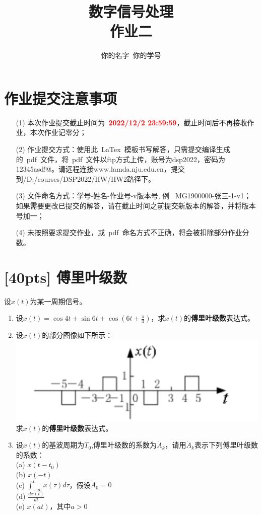 \documentclass[a4paper,UTF8]{article}
\numberwithin{equation}{section}
\begin{document}
\title{数字信号处理\\
作业二}
\author{你的名字\, 你的学号} 
\maketitle

\section*{作业提交注意事项}
\begin{tcolorbox}
\begin{enumerate}
  \item[(1)] 本次作业提交截止时间为~\textcolor{red}{\textbf{2022/12/2  23:59:59}}，截止时间后不再接收作业，本次作业记零分；
  \item[(2)] 作业提交方式：使用此~LaTex~模板书写解答，只需提交编译生成的~pdf~文件，将~pdf~文件以ftp方式上传，账号为dsp2022，密码为12345asd!@。请远程连接www.lamda.nju.edu.cn，提交到/D:/courses/DSP2022/HW/HW2路径下。
  \item[(3)] 文件命名方式：学号-姓名-作业号-v版本号, 例~ MG1900000-张三-1-v1；如果需要更改已提交的解答，请在截止时间之前提交新版本的解答，并将版本号加一；
  \item[(4)] 未按照要求提交作业，或~pdf~命名方式不正确，将会被扣除部分作业分数。

\end{enumerate}
\end{tcolorbox}


\newpage
\section{[40pts] 傅里叶级数}
设$x(t)$为某一周期信号。
\begin{enumerate}[(1)]
	\item 设$x(t)=\cos4t+\sin6t+\cos(6t+\displaystyle\frac{\pi}{3}) $，求$x(t)$的\textbf{傅里叶级数}表达式。
	\item 设$x(t)$的部分图像如下所示：\\
	\includegraphics[scale=0.4]{1.png}\\
	求$x(t)$的\textbf{傅里叶级数}表达式。
	\item 设$x(t)$的基波周期为$T_0$,傅里叶级数的系数为$\dot{A}_k$，请用$\dot{A}_k$表示下列傅里叶级数的系数：\\
	(a) $x(t-t_0)$\\
	(b) $x(-t)$\\
	(c) $\displaystyle\int_{-\infty}^tx(\tau)d\tau$，假设$\dot{A}_0=0$\\
	(d) $\displaystyle\frac{dx(t)}{dt}$\\
	(e) $x(at)$，其中$a>0$
\end{enumerate}
\end{document}
